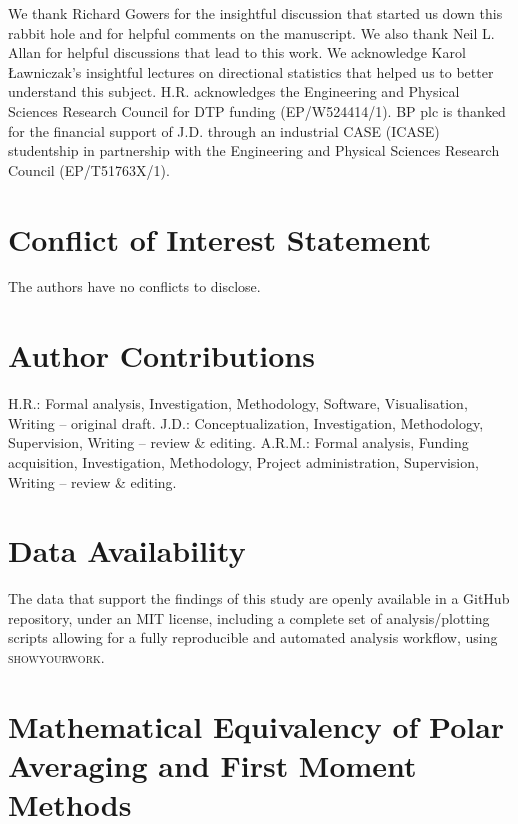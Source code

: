 \documentclass[reprint,superscriptaddress,nobibnotes,amsmath,amssymb,aip]{revtex4-2}
\begin{document}
\begin{acknowledgements}
We thank Richard Gowers for the insightful discussion that started us down this rabbit hole and for helpful comments on the manuscript.
We also thank Neil L. Allan for helpful discussions that lead to this work. 
We acknowledge Karol Ławniczak's insightful lectures on directional statistics that helped us to better understand this subject.
H.R. acknowledges the Engineering and Physical Sciences Research Council for DTP funding (EP/W524414/1). 
BP plc is thanked for the financial support of J.D. through an industrial CASE (ICASE) studentship in partnership with the Engineering and Physical Sciences Research Council (EP/T51763X/1).
\end{acknowledgements}

\section*{Conflict of Interest Statement}

The authors have no conflicts to disclose.

\section*{Author Contributions}
H.R.: Formal analysis, Investigation, Methodology, Software, Visualisation, Writing – original draft.
J.D.: Conceptualization, Investigation, Methodology, Supervision, Writing – review \& editing.
A.R.M.: Formal analysis, Funding acquisition, Investigation, Methodology, Project administration, Supervision, Writing – review \& editing.

\section*{Data Availability}

The data that support the findings of this study are openly available in a GitHub repository,\cite{richardson_github_2025} under an MIT license, including a complete set of analysis/plotting scripts allowing for a fully reproducible and automated analysis workflow, using \textsc{showyourwork}.\cite{luger_showyourwork_2021}

\appendix

\section{Mathematical Equivalency of Polar Averaging and First Moment Methods}
\label{app:math}
\end{document}
